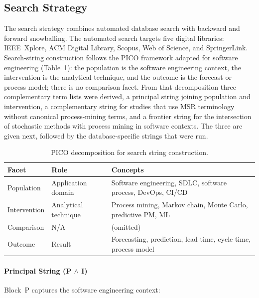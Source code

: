 \subsection{Search Strategy}
\label{sec:slr-search}

The search strategy combines automated database search with backward and
forward snowballing. The automated search targets five digital libraries:
IEEE~Xplore, ACM Digital Library, Scopus, Web of Science, and SpringerLink.
Search-string construction follows the PICO framework adapted for software
engineering (Table~\ref{tab:pico}): the population is the software
engineering context, the intervention is the analytical technique, and the
outcome is the forecast or process model; there is no comparison facet.
From that decomposition three complementary term lists were derived, a
principal string joining population and intervention, a complementary
string for studies that use MSR terminology without canonical
process-mining terms, and a frontier string for the intersection of
stochastic methods with process mining in software contexts. The three
are given next, followed by the database-specific strings that were run.

\begin{table}[htbp]
\centering
\caption{PICO decomposition for search string construction.}
\label{tab:pico}
\begin{tabular}{lp{4cm}p{7cm}}
\toprule
\textbf{Facet} & \textbf{Role} & \textbf{Concepts} \\
\midrule
Population    & Application domain    & Software engineering, SDLC, software process,
                                        DevOps, CI/CD \\
Intervention  & Analytical technique  & Process mining, Markov chain, Monte Carlo,
                                        predictive PM, ML \\
Comparison    & N/A                   & (omitted) \\
Outcome       & Result                & Forecasting, prediction, lead time, cycle time,
                                        process model \\
\bottomrule
\end{tabular}
\end{table}

\paragraph{Principal String (P $\wedge$ I)}
Block~P captures the software engineering context:

